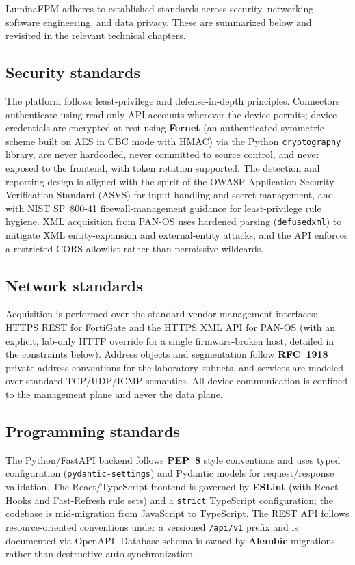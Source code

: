 LuminaFPM adheres to established standards across security, networking, software engineering, and data privacy. These are summarized below and revisited in the relevant technical chapters.

\subsection{Security standards}
The platform follows least-privilege and defense-in-depth principles. Connectors authenticate using read-only API accounts wherever the device permits; device credentials are encrypted at rest using \textbf{Fernet} (an authenticated symmetric scheme built on AES in CBC mode with HMAC) via the Python \texttt{cryptography} library, are never hardcoded, never committed to source control, and never exposed to the frontend, with token rotation supported. The detection and reporting design is aligned with the spirit of the OWASP Application Security Verification Standard (ASVS) for input handling and secret management, and with NIST SP~800-41 firewall-management guidance for least-privilege rule hygiene. XML acquisition from PAN-OS uses hardened parsing (\texttt{defusedxml}) to mitigate XML entity-expansion and external-entity attacks, and the API enforces a restricted CORS allowlist rather than permissive wildcards.

\subsection{Network standards}
Acquisition is performed over the standard vendor management interfaces: HTTPS REST for FortiGate and the HTTPS XML API for PAN-OS (with an explicit, lab-only HTTP override for a single firmware-broken host, detailed in the constraints below). Address objects and segmentation follow \textbf{RFC~1918} private-address conventions for the laboratory subnets, and services are modeled over standard TCP/UDP/ICMP semantics. All device communication is confined to the management plane and never the data plane.

\subsection{Programming standards}
The Python/FastAPI backend follows \textbf{PEP~8} style conventions and uses typed configuration (\texttt{pydantic-settings}) and Pydantic models for request/response validation. The React/TypeScript frontend is governed by \textbf{ESLint} (with React Hooks and Fast-Refresh rule sets) and a \texttt{strict} TypeScript configuration; the codebase is mid-migration from JavaScript to TypeScript. The REST API follows resource-oriented conventions under a versioned \texttt{/api/v1} prefix and is documented via OpenAPI. Database schema is owned by \textbf{Alembic} migrations rather than destructive auto-synchronization.


